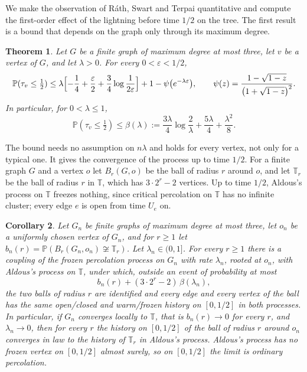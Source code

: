 \documentclass[11pt]{amsart}
\newtheorem{theorem}{Theorem}
\newtheorem{corollary}[theorem]{Corollary}
\theoremstyle{remark}
\numberwithin{equation}{section}
\newcommand{\T}{\mathbb{T}}
\newcommand{\PP}{\mathbb{P}}
\begin{document}
We make the observation of Ráth, Swart and Terpai quantitative and compute the first-order
effect of the lightning before time $1/2$ on the tree. The first result
is a bound that depends on the graph only through its maximum degree.

\begin{theorem}\label{thm:A}
Let $G$ be a finite graph of maximum degree at most three, let $v$ be a
vertex of $G$, and let $\lambda>0$. For every $0<\varepsilon<1/2$,
\begin{equation}\label{eq:A1}
\PP(\tau_v\le\tfrac12)\le
\lambda\Bigl[-\frac14+\frac\varepsilon2+\frac34\log\frac1{2\varepsilon}\Bigr]
+1-\psi\bigl(e^{-\lambda\varepsilon}\bigr),
\qquad
\psi(z)=\frac{1-\sqrt{1-z}}{\bigl(1+\sqrt{1-z}\bigr)^2}.
\end{equation}
In particular, for $0<\lambda\le1$,
\begin{equation}\label{eq:A2}
\PP(\tau_v\le\tfrac12)\le \beta(\lambda):=
\frac{3\lambda}{4}\log\frac2\lambda+\frac{5\lambda}{4}+\frac{\lambda^2}{8}.
\end{equation}
\end{theorem}

The bound needs no assumption on $n\lambda$ and holds for every vertex,
not only for a typical one. It gives the convergence of the process up to
time $1/2$. For a finite graph $G$ and a vertex $o$ let $B_r(G,o)$ be the
ball of radius $r$ around $o$, and let $\T_r$ be the ball of radius $r$
in $\T$, which has $3\cdot2^r-2$ vertices. Up to time $1/2$, Aldous's
process on $\T$ freezes nothing, since critical percolation on $\T$ has
no infinite cluster; every edge $e$ is open from time $U_e$ on.

\begin{corollary}\label{cor:B}
Let $G_n$ be finite graphs of maximum degree at most three, let $o_n$ be
a uniformly chosen vertex of $G_n$, and for $r\ge1$ let
$b_n(r)=\PP(B_r(G_n,o_n)\not\cong\T_r)$. Let $\lambda_n\in(0,1]$. For
every $r\ge1$ there is a coupling of the frozen percolation process on $G_n$ with rate
$\lambda_n$, rooted at $o_n$, with Aldous's process on $\T$, under which,
outside an event of probability at most
\begin{equation}\label{eq:B1}
b_n(r)+(3\cdot2^r-2)\,\beta(\lambda_n),
\end{equation}
the two balls of radius $r$ are identified and every edge and every
vertex of the ball has the same open/closed and warm/frozen history on
$[0,1/2]$ in both processes. In particular, if $G_n$ converges locally to
$\T$, that is $b_n(r)\to0$ for every $r$, and $\lambda_n\to0$, then for
every $r$ the history on $[0,1/2]$ of the ball of radius $r$ around $o_n$
converges in law to the history of $\T_r$ in Aldous's process. Aldous's
process has no frozen vertex on $[0,1/2]$ almost surely, so on
$[0,1/2]$ the limit is ordinary percolation.
\end{corollary}
\end{document}
